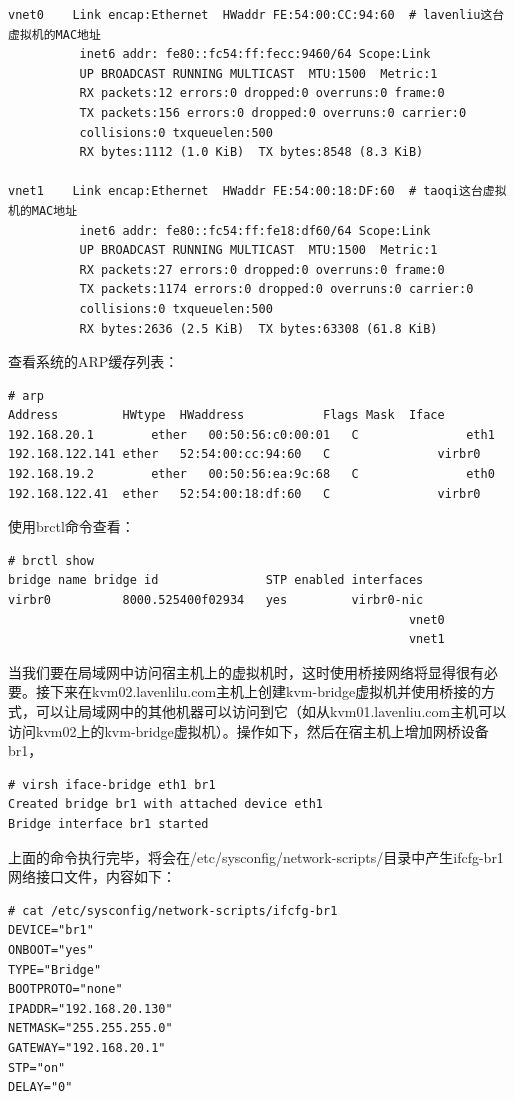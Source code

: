 \begin{verbatim}
vnet0    Link encap:Ethernet  HWaddr FE:54:00:CC:94:60  # lavenliu这台虚拟机的MAC地址
          inet6 addr: fe80::fc54:ff:fecc:9460/64 Scope:Link
          UP BROADCAST RUNNING MULTICAST  MTU:1500  Metric:1
          RX packets:12 errors:0 dropped:0 overruns:0 frame:0
          TX packets:156 errors:0 dropped:0 overruns:0 carrier:0
          collisions:0 txqueuelen:500 
          RX bytes:1112 (1.0 KiB)  TX bytes:8548 (8.3 KiB)

vnet1    Link encap:Ethernet  HWaddr FE:54:00:18:DF:60  # taoqi这台虚拟机的MAC地址
          inet6 addr: fe80::fc54:ff:fe18:df60/64 Scope:Link
          UP BROADCAST RUNNING MULTICAST  MTU:1500  Metric:1
          RX packets:27 errors:0 dropped:0 overruns:0 frame:0
          TX packets:1174 errors:0 dropped:0 overruns:0 carrier:0
          collisions:0 txqueuelen:500 
          RX bytes:2636 (2.5 KiB)  TX bytes:63308 (61.8 KiB)
\end{verbatim}

查看系统的ARP缓存列表：

\begin{verbatim}
# arp
Address			HWtype  HWaddress			Flags Mask	Iface
192.168.20.1		ether   00:50:56:c0:00:01	C 				eth1
192.168.122.141	ether   52:54:00:cc:94:60	C				virbr0
192.168.19.2		ether   00:50:56:ea:9c:68	C				eth0
192.168.122.41	ether   52:54:00:18:df:60	C				virbr0
\end{verbatim}

使用brctl命令查看：

\begin{verbatim}
# brctl show
bridge name	bridge id				STP enabled	interfaces
virbr0			8000.525400f02934	yes			virbr0-nic
														vnet0
														vnet1
\end{verbatim}

当我们要在局域网中访问宿主机上的虚拟机时，这时使用桥接网络将显得很有必要。接下来在kvm02.lavenlilu.com主机上创建kvm-bridge虚拟机并使用桥接的方式，可以让局域网中的其他机器可以访问到它（如从kvm01.lavenliu.com主机可以访问kvm02上的kvm-bridge虚拟机）。操作如下，然后在宿主机上增加网桥设备br1，

\begin{verbatim}
# virsh iface-bridge eth1 br1
Created bridge br1 with attached device eth1
Bridge interface br1 started
\end{verbatim}

上面的命令执行完毕，将会在/etc/sysconfig/network-scripts/目录中产生ifcfg-br1网络接口文件，内容如下：

\begin{verbatim}
# cat /etc/sysconfig/network-scripts/ifcfg-br1
DEVICE="br1"
ONBOOT="yes"
TYPE="Bridge"
BOOTPROTO="none"
IPADDR="192.168.20.130"
NETMASK="255.255.255.0"
GATEWAY="192.168.20.1"
STP="on"
DELAY="0"
\end{verbatim}

